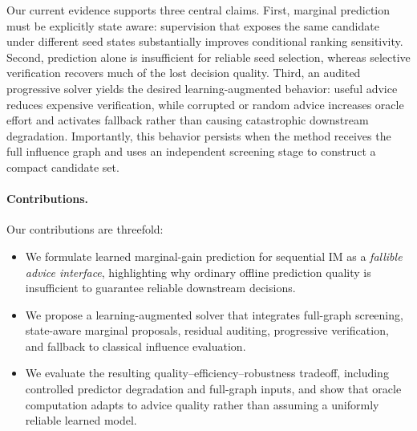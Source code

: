 Our current evidence supports three central claims. First, marginal prediction must be explicitly state aware: supervision that exposes the same candidate under different seed states substantially improves conditional ranking sensitivity. Second, prediction alone is insufficient for reliable seed selection, whereas selective verification recovers much of the lost decision quality. Third, an audited progressive solver yields the desired learning-augmented behavior: useful advice reduces expensive verification, while corrupted or random advice increases oracle effort and activates fallback rather than causing catastrophic downstream degradation. Importantly, this behavior persists when the method receives the full influence graph and uses an independent screening stage to construct a compact candidate set.

\paragraph{Contributions.}
Our contributions are threefold:
\begin{itemize}
    \item We formulate learned marginal-gain prediction for sequential IM as a \emph{fallible advice interface}, highlighting why ordinary offline prediction quality is insufficient to guarantee reliable downstream decisions.
    \item We propose a learning-augmented solver that integrates full-graph screening, state-aware marginal proposals, residual auditing, progressive verification, and fallback to classical influence evaluation.
    \item We evaluate the resulting quality--efficiency--robustness tradeoff, including controlled predictor degradation and full-graph inputs, and show that oracle computation adapts to advice quality rather than assuming a uniformly reliable learned model.
\end{itemize}
